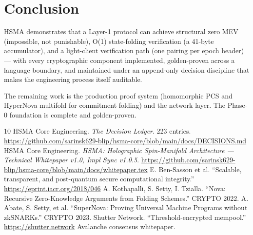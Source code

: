 \documentclass[11pt,a4paper]{article}
\begin{document}
\section{Conclusion}

HSMA demonstrates that a Layer-1 protocol can achieve structural zero
MEV (impossible, not punishable), O(1) state-folding verification (a
41-byte accumulator), and a light-client verification path (one
pairing per epoch header) --- with every cryptographic component
implemented, golden-proven across a language boundary, and maintained
under an append-only decision discipline that makes the engineering
process itself auditable.

The remaining work is the production proof system (homomorphic PCS and
HyperNova multifold for commitment folding) and the network layer. The
Phase-0 foundation is complete and golden-proven.


\begin{thebibliography}{10}
 HSMA Core Engineering. \emph{The Decision Ledger}. 223 entries. \url{https://github.com/sarinsk629-blip/hsma-core/blob/main/docs/DECISIONS.md}
 HSMA Core Engineering. \emph{HSMA: Holographic Spin-Manifold Architecture — Technical Whitepaper v1.0, Impl Sync v1.0.5}. \url{https://github.com/sarinsk629-blip/hsma-core/blob/main/docs/whitepaper.tex}
 E. Ben-Sasson et al. ``Scalable, transparent, and post-quantum secure computational integrity.'' \url{https://eprint.iacr.org/2018/046}
 A. Kothapalli, S. Setty, I. Tzialla. ``Nova: Recursive Zero-Knowledge Arguments from Folding Schemes.'' CRYPTO 2022.
 A. Abate, S. Setty, et al. ``SuperNova: Proving Universal Machine Programs without zkSNARKs.'' CRYPTO 2023.
 Shutter Network. ``Threshold-encrypted mempool.'' \url{https://shutter.network}
 Avalanche consensus whitepaper.
\end{thebibliography}
\end{document}

